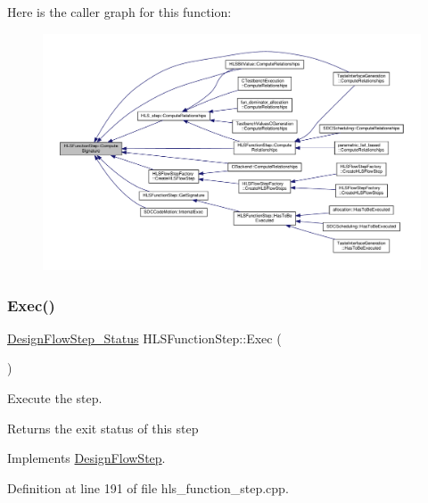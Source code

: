 Here is the caller graph for this function\+:
\nopagebreak
\begin{figure}[H]
\begin{center}
\leavevmode
\includegraphics[width=350pt]{d9/d41/classHLSFunctionStep_ad9231528f2ec201d423ae69ac7db9719_icgraph}
\end{center}
\end{figure}
\mbox{\label{classHLSFunctionStep_aa23c7b38f7775f2e11cee12a45173f95}} 
\subsubsection{\texorpdfstring{Exec()}{Exec()}}
{\footnotesize\ttfamily \hyperlink{design__flow__step_8hpp_afb1f0d73069c26076b8d31dbc8ebecdf}{Design\+Flow\+Step\+\_\+\+Status} H\+L\+S\+Function\+Step\+::\+Exec (\begin{DoxyParamCaption}{ }\end{DoxyParamCaption})\hspace{0.3cm}{\ttfamily [virtual]}}



Execute the step. 

\begin{DoxyReturn}{Returns}
the exit status of this step 
\end{DoxyReturn}


Implements \hyperlink{classDesignFlowStep_a77d7e38493016766098711ea24f60b89}{Design\+Flow\+Step}.



Definition at line 191 of file hls\+\_\+function\+\_\+step.\+cpp.



